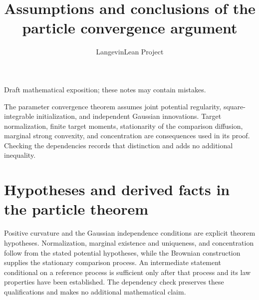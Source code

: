 \documentclass[11pt,a4paper]{article}
\title{\texorpdfstring{Assumptions and conclusions of the particle convergence argument}{Assumptions and conclusions of the particle convergence argument}}
\author{LangevinLean Project}
\date{}
\begin{document}
\maketitle
Draft mathematical exposition; these notes may contain mistakes.


The parameter convergence theorem assumes joint potential regularity, square-integrable initialization, and independent Gaussian innovations. Target normalization, finite target moments, stationarity of the comparison diffusion, marginal strong convexity, and concentration are consequences used in its proof. Checking the dependencies records that distinction and adds no additional inequality.



\section{\texorpdfstring{Hypotheses and derived facts in the particle theorem}{Hypotheses and derived facts in the particle theorem}}


Positive curvature and the Gaussian independence conditions are explicit theorem hypotheses. Normalization, marginal existence and uniqueness, and concentration follow from the stated potential hypotheses, while the Brownian construction supplies the stationary comparison process. An intermediate statement conditional on a reference process is sufficient only after that process and its law properties have been established. The dependency check preserves these qualifications and makes no additional mathematical claim.
\end{document}
